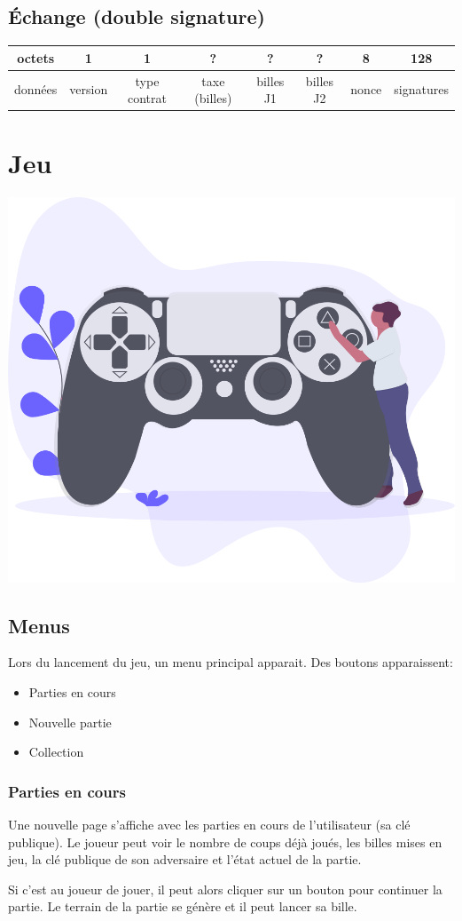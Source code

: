 \documentclass{article}
\begin{document}
\subsection{Échange (double signature)}
\hspace*{-1cm}%
\begin{tabular}{ |c|c|c|c|c|c|c|c|} 
 \hline
 octets & 1 & 1 & ? & ? & ? & 8 & 128\\ 
 \hline
    données & version & type contrat & taxe (billes) & billes J1 & billes J2 & nonce & signatures\\ 
 \hline
\end{tabular}

\newpage

\section{Jeu}
\includegraphics[width=0.3\linewidth]{assets/gaming.png}\\
\subsection{Menus}

Lors du lancement du jeu, un menu principal apparait. Des boutons apparaissent:
\begin{itemize}
    \item Parties en cours
    \item Nouvelle partie
    \item Collection
\end{itemize}

\subsubsection{Parties en cours}
Une nouvelle page s'affiche avec les parties en cours de l'utilisateur (sa clé publique). Le joueur peut voir le nombre de coups déjà joués, les billes mises en jeu, la clé publique de son adversaire et l'état actuel de la partie.

Si c'est au joueur de jouer, il peut alors cliquer sur un bouton pour continuer la partie. Le terrain de la partie se génère et il peut lancer sa bille.
\end{document}

